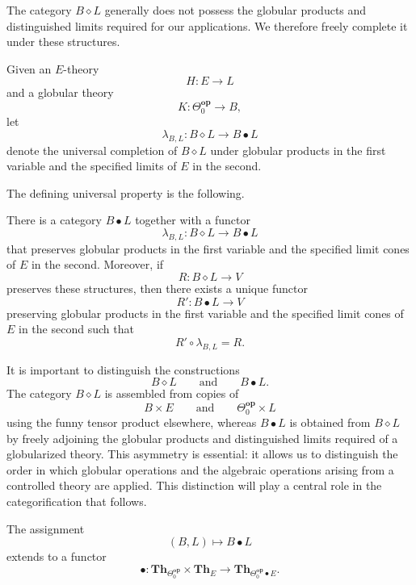 \documentclass{tac}
\begin{document}
The category $B\diamond L$ generally does not possess the globular products and distinguished limits required for our applications. We therefore freely complete it under these structures.

\begin{notation}\label{Uni_lim_compl_of_glob}
Given an $E$-theory
\[
H:E\to L
\]
and a globular theory
\[
K:\Theta_0^\mathbf{op}\to B,
\]
let
\[
\lambda_{B,L}:B\diamond L\longrightarrow B\bullet L
\]
denote the universal completion of $B\diamond L$ under globular products in the first variable and the specified limits of $E$ in the second.
\end{notation}

The defining universal property is the following.

\begin{lemma}
There is a category $B\bullet L$ together with a functor
\[
\lambda_{B,L}:B\diamond L\longrightarrow B\bullet L
\]
that preserves globular products in the first variable and the specified limit cones of $E$ in the second. Moreover, if
\[
R:B\diamond L\longrightarrow V
\]
preserves these structures, then there exists a unique functor
\[
R':B\bullet L\longrightarrow V
\]
preserving globular products in the first variable and the specified limit cones of $E$ in the second such that
\[
R'\circ\lambda_{B,L}=R.
\]
\end{lemma}

It is important to distinguish the constructions
\[
B\diamond L
\qquad\text{and}\qquad
B\bullet L.
\]
The category $B\diamond L$ is assembled from copies of
\[
B\times E
\qquad\text{and}\qquad
\Theta_0^\mathbf{op}\times L
\]
using the funny tensor product elsewhere, whereas $B\bullet L$ is obtained from $B\diamond L$ by freely adjoining the globular products and distinguished limits required of a globularized theory. This asymmetry is essential: it allows us to distinguish the order in which globular operations and the algebraic operations arising from a controlled theory are applied. This distinction will play a central role in the categorification that follows.

\begin{lemma}
The assignment
\[
(B,L)\longmapsto B\bullet L
\]
extends to a functor
\[
\bullet:
\mathbf{Th}_{\Theta_0^\mathbf{op}}
\times
\mathbf{Th}_E
\longrightarrow
\mathbf{Th}_{\Theta_0^\mathbf{op}\bullet E}.
\]
\end{lemma}
\end{document}
